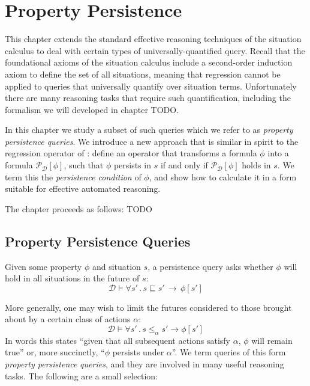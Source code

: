 


\chapter{Property Persistence}

\label{ch:persistence}

This chapter extends the standard effective reasoning techniques of
the situation calculus to deal with certain types of universally-quantified
query. Recall that the foundational axioms of the situation calculus
include a second-order induction axiom to define the set of all situations,
meaning that regression cannot be applied to queries that universally
quantify over situation terms. Unfortunately there are many reasoning
tasks that require such quantification, including the formalism we
will developed in chapter TODO.

In this chapter we study a subset of such queries which we refer to
as \emph{property persistence queries}. We introduce a new approach
that is similar in spirit to the regression operator of \citep{reiter91frameprob}:
define an operator that transforms a formula $\phi$ into a formula
$\mathcal{P}_{\mathcal{D}}[\phi]$, such that $\phi$ persists in
$s$ if and only if $\mathcal{P}_{\mathcal{D}}[\phi]$ holds in $s$.
We term this the \emph{persistence condition} of $\phi$, and show
how to calculate it in a form suitable for effective automated reasoning.

The chapter proceeds as follows: TODO


\section{Property Persistence Queries}

Given some property $\phi$ and situation $s$, a persistence query
asks whether $\phi$ will hold in all situations in the future of
$s$:\[
\mathcal{D}\models\forall s'\,.\, s\sqsubseteq s'\,\rightarrow\,\phi[s']\]


More generally, one may wish to limit the futures considered to those
brought about by a certain class of actions $\alpha$:\[
\mathcal{D}\models\forall s'\,.\, s\le_{\alpha}s'\rightarrow\phi[s']\]
 In words this states {}``given that all subsequent actions satisfy
$\alpha$, $\phi$ will remain true'' or, more succinctly, {}``$\phi$
persists under $\alpha$''. We term queries of this form \emph{property
persistence} \emph{queries}, and they are involved in many useful
reasoning tasks. The following are a small selection:

